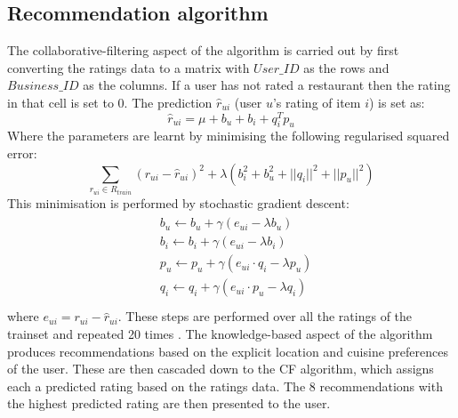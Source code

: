 \documentclass[conference]{IEEEtran}
\begin{document}
\subsection{Recommendation algorithm}
The collaborative-filtering aspect of the algorithm is carried out by first converting the ratings data to a 
matrix with $User\_ID$ as the rows and $Business\_ID$ as the columns. 
If a user has not rated a restaurant then the rating in that cell is set to 0. 
The prediction $\widehat{r}_{ui}$ (user $u$'s rating of item $i$) is set as:
\begin{equation}
    \widehat{r}_{ui} = \mu + b_u + b_i + q_i^Tp_u
\end{equation}
Where the parameters are learnt by minimising the following regularised squared error: 
\begin{equation}
    \sum_{r_{ui}\in{R_{train}}} (r_{ui} - \widehat{r}_{ui})^2 + \lambda(b_i^2 + b_u^2 + ||q_i||^2 + ||p_u||^2)
\end{equation}
This minimisation is performed by stochastic gradient descent:
\begin{align}
    \begin{split}
    & b_u \gets b_u + \gamma(e_{ui} - \lambda b_u) \\
    & b_i \gets b_i + \gamma(e_{ui} - \lambda b_i) \\ 
    & p_u \gets p_u + \gamma(e_{ui} \cdot q_i - \lambda p_u) \\ 
    & q_i \gets q_i + \gamma(e_{ui} \cdot p_u - \lambda q_i) \\
    \end{split}
\end{align}
where $e_{ui} = r_{ui} - \widehat{r}_{ui}$. 
These steps are performed over all the ratings of the trainset and repeated 20 times \cite{SVD}. 
The knowledge-based aspect of the algorithm produces recommendations based on the explicit location and cuisine 
preferences of the user. 
These are then cascaded down to the CF algorithm, which assigns each a predicted rating based on the ratings data. 
The 8 recommendations with the highest predicted rating are then presented to the user. 
\end{document}

